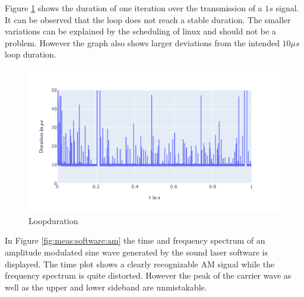 Figure \ref{fig:meas:software:duration} shows the duration of one iteration over the transmission of a $1s$ signal. It can be observed that the loop does not reach a stable duration. The smaller variations can be explained by the scheduling of linux and should not be a problem. However the graph also shows larger deviations from the intended $10\mu s$ loop duration.
%
\begin{figure}
  \centering
  \includegraphics[height=\mediumheight]{src/assets/pictures/measurements/software_duration.pdf}
  \caption{Loopduration}\label{fig:meas:software:duration}
\end{figure}
\p
In Figure \ref{fig:meas:software:am} the time and frequency spectrum of an amplitude modulated sine wave generated by the sound laser software is displayed. The time plot shows a clearly recognizable AM signal while the frequency spectrum is quite distorted. However the peak of the carrier wave as well as the upper and lower sideband are unmistakable.
%
